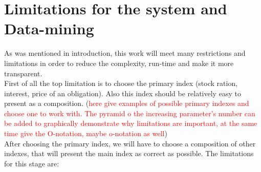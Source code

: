 \documentclass[11pt]{article}
\begin{document}
\section{Limitations for the system and Data-mining}
As was mentioned in introduction, this work will meet many restrictions and limitations in order to reduce the complexity, run-time and make it more transparent. \\
First of all the top limitation is to choose the primary index (stock ration, interest, price of an  obligation). Also this index should be relatively easy to present as a composition. (\textcolor{red}{here give examples of possible primary indexes and choose one to work with. The pyramid o the increasing parameter's number can be added to graphically demonstrate why limitations are important, at the same time give the O-notation, maybe o-notation as well})\\
After choosing the primary index, we will have to choose a composition of other indexes, that will present the main index as correct as possible. The limitations for this stage are:
\end{document}
